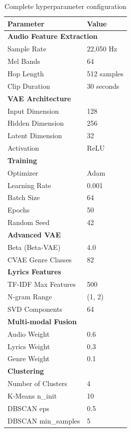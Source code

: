 \documentclass{article}
\begin{document}
\begin{table}[h]
\centering
\begin{tabular}{ll}
\toprule
Parameter & Value \\
\midrule
\multicolumn{2}{l}{\textbf{Audio Feature Extraction}} \\
Sample Rate & 22,050 Hz \\
Mel Bands & 64 \\
Hop Length & 512 samples \\
Clip Duration & 30 seconds \\
\midrule
\multicolumn{2}{l}{\textbf{VAE Architecture}} \\
Input Dimension & 128 \\
Hidden Dimension & 256 \\
Latent Dimension & 32 \\
Activation & ReLU \\
\midrule
\multicolumn{2}{l}{\textbf{Training}} \\
Optimizer & Adam \\
Learning Rate & 0.001 \\
Batch Size & 64 \\
Epochs & 50 \\
Random Seed & 42 \\
\midrule
\multicolumn{2}{l}{\textbf{Advanced VAE}} \\
Beta (Beta-VAE) & 4.0 \\
CVAE Genre Classes & 82 \\
\midrule
\multicolumn{2}{l}{\textbf{Lyrics Features}} \\
TF-IDF Max Features & 500 \\
N-gram Range & (1, 2) \\
SVD Components & 64 \\
\midrule
\multicolumn{2}{l}{\textbf{Multi-modal Fusion}} \\
Audio Weight & 0.6 \\
Lyrics Weight & 0.3 \\
Genre Weight & 0.1 \\
\midrule
\multicolumn{2}{l}{\textbf{Clustering}} \\
Number of Clusters & 4 \\
K-Means n\_init & 10 \\
DBSCAN eps & 0.5 \\
DBSCAN min\_samples & 5 \\
\bottomrule
\end{tabular}
\caption{Complete hyperparameter configuration}
\end{table}
\end{document}
